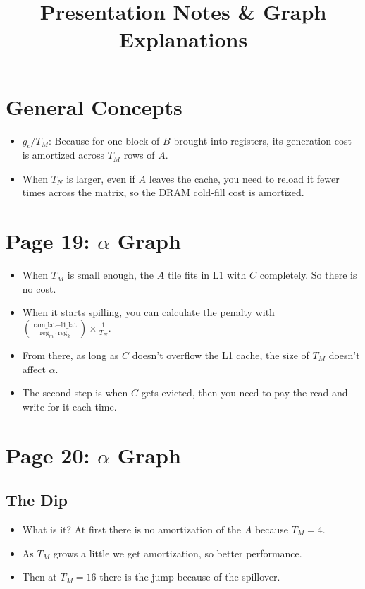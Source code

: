 \documentclass[11pt, a4paper]{article}
\title{\textbf{Presentation Notes \& Graph Explanations}}
\author{}
\date{}
\begin{document}
\maketitle
\vspace{-1.5cm}

\section*{General Concepts}
\begin{itemize}
    \item $g_c / T_M$: Because for one block of $B$ brought into registers, its generation cost is amortized across $T_M$ rows of $A$.
    \item When $T_N$ is larger, even if $A$ leaves the cache, you need to reload it fewer times across the matrix, so the DRAM cold-fill cost is amortized.
\end{itemize}

\section*{Page 19: $\alpha$ Graph}
\begin{itemize}
    \item When $T_M$ is small enough, the $A$ tile fits in L1 with $C$ completely. So there is no cost.
    \item When it starts spilling, you can calculate the penalty with $\left(\frac{\text{ram\_lat} - \text{l1\_lat}}{\text{reg}_m \cdot \text{reg}_k}\right) \times \frac{1}{T_N}$.
    \item From there, as long as $C$ doesn't overflow the L1 cache, the size of $T_M$ doesn't affect $\alpha$.
    \item The second step is when $C$ gets evicted, then you need to pay the read and write for it each time.
\end{itemize}

\section*{Page 20: $\alpha$ Graph}
\subsection*{The Dip}
\begin{itemize}
    \item What is it? At first there is no amortization of the $A$ because $T_M = 4$.
    \item As $T_M$ grows a little we get amortization, so better performance.
    \item Then at $T_M = 16$ there is the jump because of the spillover.
\end{itemize}
\end{document}
